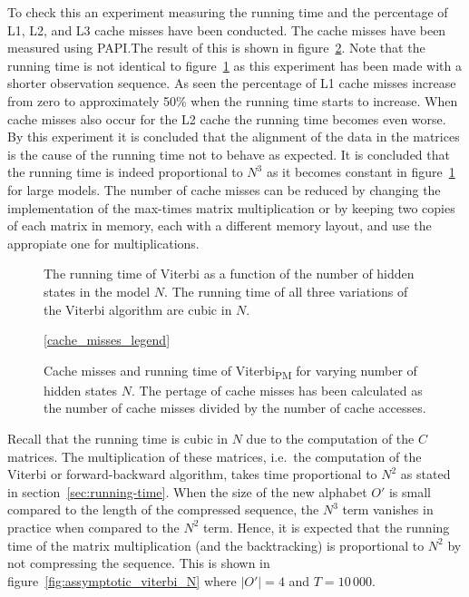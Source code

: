 To check this an experiment measuring the running time and the percentage of
L1, L2, and L3 cache misses have been conducted. The cache misses have been
measured using PAPI.\@ The result of this is shown in
figure~\ref{fig:cache-misses}. Note that the running time is not identical to
figure~\ref{fig:assymptotic_viterbi_backtrack_N} as this experiment has been
made with a shorter observation sequence. As seen the percentage of L1 cache
misses increase from zero to approximately 50\% when the running time starts to
increase. When cache misses also occur for the L2 cache the running time
becomes even worse. By this experiment it is concluded that the alignment of
the data in the matrices is the cause of the running time not to behave as
expected. It is concluded that the running time is indeed proportional to $N^3$
as it becomes constant in figure~\ref{fig:assymptotic_viterbi_backtrack_N} for
large models. The number of cache misses can be reduced by changing the
implementation of the max-times matrix multiplication or by keeping two copies
of each matrix in memory, each with a different memory layout, and use the
appropiate one for multiplications.

\begin{figure}
  \centering
  
  \caption{The running time of Viterbi as a function of the number of hidden
    states in the model $N$. The running time of all three variations of the Viterbi
    algorithm are cubic in $N$.}
  \label{fig:assymptotic_viterbi_backtrack_N}
\end{figure}

\begin{figure}
  \centering\ref{cache_misses_legend}\\
  
  \caption{Cache misses and running time of Viterbi\textsubscript{PM} for
    varying number of hidden states $N$. The pertage of cache misses has been
    calculated as the number of cache misses divided by the number of cache
    accesses.}
  \label{fig:cache-misses}
\end{figure}

Recall that the running time is cubic in $N$ due to the computation of the
$C$ matrices. The multiplication of these matrices, i.e.\ the computation
of the Viterbi or forward-backward algorithm, takes time
proportional to $N^2$ as stated in section~\ref{sec:running-time}. When the
size of the new alphabet $O'$ is small compared to the length of the compressed
sequence, the $N^3$ term vanishes in practice when compared to the $N^2$
term. Hence, it is expected that the running time of the matrix multiplication
(and the backtracking) is proportional to $N^2$ by not compressing the
sequence. This is shown in figure~\ref{fig:assymptotic_viterbi_N} where
$\lvert O' \rvert = 4$ and $T = 10\,000$.

